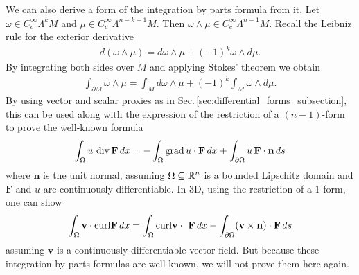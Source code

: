 \documentclass[../master_thesis.tex]{subfiles}
\begin{document}
We can also derive a form of the integration by parts formula from it. 
Let $\omega \in C_c^\infty \Lambda^k M$ and $\mu \in C_c^\infty \Lambda^{n-k-1}  M$. 
Then $\omega \wedge \mu \in C_c^\infty \Lambda^{n-1} M$. Recall the 
Leibniz rule for the exterior derivative 
\begin{align*}
    d(\omega \wedge \mu) = d\omega \wedge \mu + (-1)^k \omega \wedge d\mu. 
\end{align*}
By integrating both sides over $M$ and applying Stokes' theorem we obtain
\begin{align*}
    \int_{\partial M} \omega \wedge \mu 
    = \int_M d\omega \wedge \mu + (-1)^k \int_M \omega \wedge d\mu.
\end{align*}
By using vector and scalar proxies as in Sec.\,\ref{sec:differential_forms_subsection},
this can be used along with the expression of the restriction of a $(n-1)$-form to 
prove the well-known formula
\begin{align*}
    \int_\Omega u\,\operatorname{div} \mathbf{F} \, dx 
    =  - \int_\Omega \operatorname{grad} u \cdot \mathbf{F} \, dx + 
        \int_{\partial \Omega } u \, \mathbf{F}\cdot \mathbf{n} \, ds
\end{align*}
where $\mathbf{n}$ is the unit normal, assuming $\Omega \subseteq \mathbb{R}^n$ is a bounded Lipschitz domain
and $\mathbf{F}$ and $u$ are continuously differentiable.
In 3D, using the restriction of a $1$-form, one can show
\begin{align*}
    \int_\Omega \mathbf{v} \cdot \mathbf{\operatorname{curl}} \mathbf{F} \, dx
    = \int_\Omega \mathbf{\operatorname{curl}} \mathbf{v} \cdot \ \mathbf{F} \, dx
        - \int_{\partial \Omega } (\mathbf{v} \times \mathbf{n})\cdot \mathbf{F} \, ds
\end{align*}
assuming $\mathbf{v}$ is a continuously differentiable vector field. But 
because these integration-by-parts formulas are well known, we will not prove
them here again.
\end{document}
